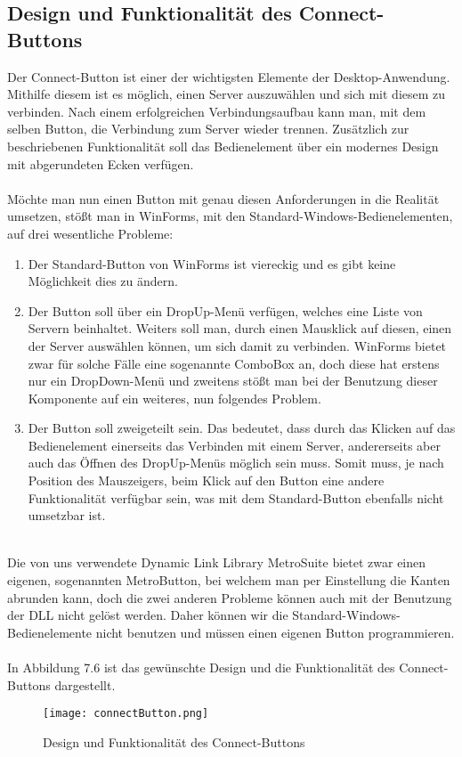 \subsection{Design und Funktionalität des Connect-Buttons}

Der Connect-Button ist einer der wichtigsten Elemente der Desktop-Anwendung. Mithilfe diesem ist es möglich, einen Server auszuwählen und sich mit diesem zu verbinden. Nach einem erfolgreichen Verbindungsaufbau kann man, mit dem selben Button, die Verbindung zum Server wieder trennen. Zusätzlich zur beschriebenen Funktionalität soll das Bedienelement über ein modernes Design mit abgerundeten Ecken verfügen.
\\ \ \\
Möchte man nun einen Button mit genau diesen Anforderungen in die Realität umsetzen, stößt man in WinForms, mit den Standard-Windows-Bedienelementen, auf drei wesentliche Probleme:
\\
\begin{enumerate}
 \item Der Standard-Button von WinForms ist viereckig und es gibt keine Möglichkeit dies zu ändern.
 \item Der Button soll über ein DropUp-Menü verfügen, welches eine Liste von Servern beinhaltet. Weiters soll man, durch einen Mausklick auf diesen, einen der Server auswählen können, um sich damit zu verbinden. WinForms bietet zwar für solche Fälle eine sogenannte ComboBox an, doch diese hat erstens nur ein DropDown-Menü und zweitens stößt man bei der Benutzung dieser Komponente auf ein weiteres, nun folgendes Problem.
 \item Der Button soll zweigeteilt sein. Das bedeutet, dass durch das Klicken auf das Bedienelement einerseits das Verbinden mit einem Server, andererseits aber auch das Öffnen des DropUp-Menüs möglich sein muss. Somit muss, je nach Position des Mauszeigers, beim Klick auf den Button eine andere Funktionalität verfügbar sein, was mit dem Standard-Button ebenfalls nicht umsetzbar ist.
\end{enumerate}
\ \\
Die von uns verwendete Dynamic Link Library MetroSuite bietet zwar einen eigenen, sogenannten MetroButton, bei welchem man per Einstellung die Kanten abrunden kann, doch die zwei anderen Probleme können auch mit der Benutzung der DLL nicht gelöst werden. Daher können wir die Standard-Windows-Bedienelemente nicht benutzen und müssen einen eigenen Button programmieren.
\\ \ \\
In Abbildung 7.6 ist das gewünschte Design und die Funktionalität des Connect-Buttons dargestellt.
\begin{figure}[H]
    \centering
    \texttt{[image: connectButton.png]}
    \caption{Design und Funktionalität des Connect-Buttons} 
\end{figure}

